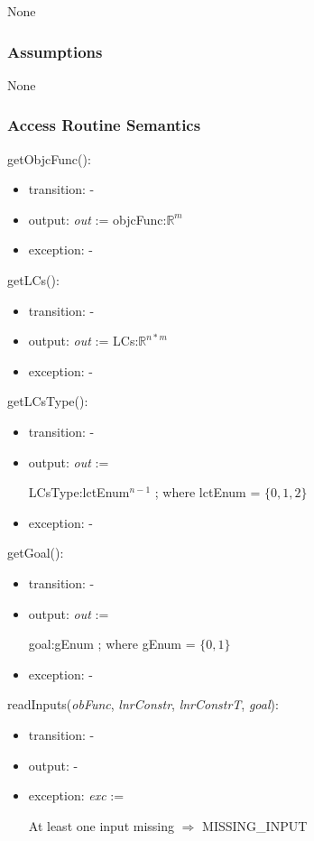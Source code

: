 \documentclass[12pt, titlepage]{article}
\begin{document}
None

\subsubsection{Assumptions}

None

\subsubsection{Access Routine Semantics}

\noindent 
getObjcFunc():
\begin{itemize}
	\item transition: -
	\item output: \textit{out} := objcFunc:$\mathbb{R} ^m$
	\item exception: -
\end{itemize}

\noindent 
getLCs():
\begin{itemize}
	\item transition: -
	\item output: \textit{out} := LCs:$\mathbb{R} ^{n*m}$
	\item exception: -
\end{itemize}

\noindent 
getLCsType():
\begin{itemize}
	\item transition: -
	\item output: \textit{out} := 
	
	LCsType:lctEnum$^{n-1}$ ; where lctEnum = $\{0,1,2\}$ 
	\item exception: -
\end{itemize}

\noindent 
getGoal():
\begin{itemize}
	\item transition: -
	\item output: \textit{out} := 
	
	goal:gEnum ; where gEnum = $\{0,1\}$
	\item exception: -
\end{itemize}

\noindent 
readInputs(\textit{obFunc}, \textit{lnrConstr}, \textit{lnrConstrT}, 
\textit{goal}):
\begin{itemize}
	\item transition: -
	\item output: -
	\item exception: \textit{exc} := 
	
	At least one input missing \hspace{3.5cm} $\Rightarrow$ MISSING{\_}INPUT
\end{itemize}
\end{document}

